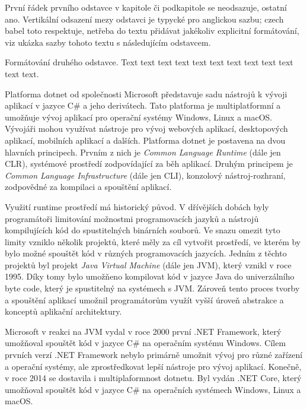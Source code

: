 
První řádek prvního odstavce v kapitole či podkapitole se neodsazuje, ostatní ano. Vertikální odsazení mezy odstavci je typycké pro anglickou sazbu; czech babel toto respektuje, netřeba do textu přidávat jakékoliv explicitní formátování, viz ukázka sazby tohoto textu s následujícím odstavcem.

Formátování druhého odstavce. Text text text text text text text text text text text text.



Platforma dotnet od společnosti Microsoft představuje sadu nástrojů k vývoji aplikací v jazyce C\# a jeho derivátech. Tato platforma je multiplatformní a umožňuje vývoj aplikací pro operační systémy Windows, Linux a macOS. Vývojáři mohou využívat nástroje pro vývoj webových aplikací, desktopových aplikací, mobilních aplikací a dalších. Platforma dotnet je postavena na dvou hlavních principech. Prvním z nich je \textit{Common Language Runtime} (dále jen CLR), systémové prostředí zodpovídající za běh aplikací. Druhým principem je \textit{Common Language Infrastructure} (dále jen CLI), konzolový nástroj-rozhraní, zodpovědné za kompilaci a spouštění aplikací. \cite{dotnet}

Využití runtime prostředí má historický původ. V dřívějších dobách byly programátoři limitování možnostmi programovacích jazyků a nástrojů kompilujících kód do spustitelných binárních souborů. Ve snazu omezit tyto limity vzniklo několik projektů, které měly za cíl vytvořit prostředí, ve kterém by bylo možné spouštět kód v různých programovacích jazycích. Jedním z těchto projektů byl projekt \textit{Java Virtual Machine} (dále jen JVM), který vznikl v roce 1995. Díky tomy bylo umožňeno kompilovat kód v jazyce Java do univerzálního byte code, který je spustitelný na systémech s JVM. Zároveň tento proces tvorby a spouštění aplikací umožnil programátorům využít vyšší úroveň abstrakce a konceptů aplikační architektury.

Microsoft v reakci na JVM vydal v roce 2000 první .NET Framework, který umožňoval spouštět kód v jazyce C\# na operačním systému Windows. Cílem prvních verzí .NET Framework nebylo primárně umožnit vývoj pro různé zařízení a operační systémy, ale zprostředkovat lepší nástroje pro vývoj aplikací. Konečně, v roce 2014 se dostavila i multiplaformnost dotnetu. Byl vydán .NET Core, který umožňoval spouštět kód v jazyce C\# na operačních systémech Windows, Linux a macOS. \cite{dotnet}

